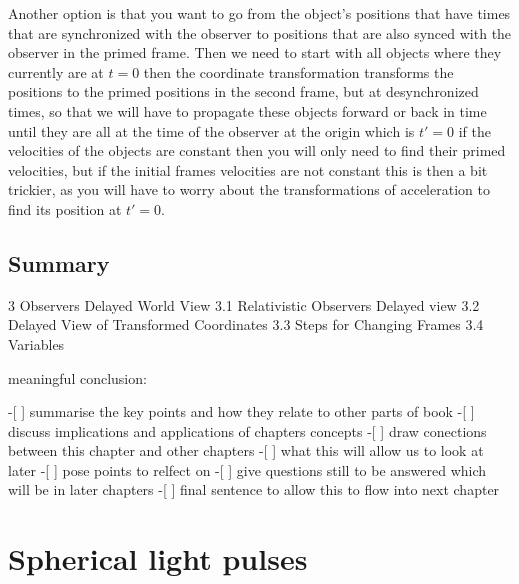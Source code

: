 Another option is that you want to go from the object's positions that have times that are synchronized with the observer to positions that are also synced with the observer in the primed frame.
Then we need to start with all objects where they currently are at ${t} = 0$ then the coordinate transformation transforms the positions to the primed positions in the second frame, but at desynchronized times, so that we will have to propagate these objects forward or back in time until they are all at the time of the observer at the origin which is ${t{'}} = 0$ if the velocities of the objects are constant then you will only need to find their primed velocities, but if the initial frames velocities are not constant this is then a bit trickier, as you will have to worry about the transformations of acceleration to find its position at ${t{'}} = 0$.

\section{Summary}

3 Observers Delayed World View
3.1 Relativistic Observers Delayed view
3.2 Delayed View of Transformed Coordinates
3.3 Steps for Changing Frames
3.4 Variables

meaningful conclusion:

-[ ] summarise the key points and how they relate to other parts of book
-[ ] discuss implications and applications of chapters concepts
-[ ] draw conections between this chapter and other chapters
-[ ] what this will allow us to look at later
-[ ] pose points to relfect on
-[ ] give questions still to be answered which will be in later chapters
-[ ] final sentence to allow this to flow into next chapter



\printbibliography[segment=\therefsegment, heading=subbibliography]

\chapter{Spherical light pulses} \label{ch: Spherical light pulses}

